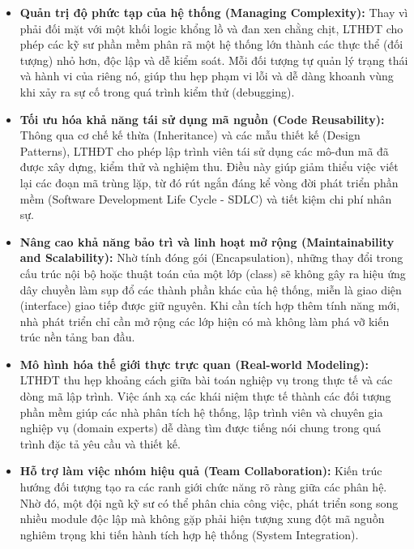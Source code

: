 \documentclass[12pt,a4paper]{article}
\begin{document}
\begin{itemize}[label={\scalebox{1.2}{$\circ$}}, leftmargin=2em]
    \item \textbf{Quản trị độ phức tạp của hệ thống (Managing Complexity):} Thay vì phải đối mặt với một khối logic khổng lồ và đan xen chằng chịt, LTHĐT cho phép các kỹ sư phần mềm phân rã một hệ thống lớn thành các thực thể (đối tượng) nhỏ hơn, độc lập và dễ kiểm soát. Mỗi đối tượng tự quản lý trạng thái và hành vi của riêng nó, giúp thu hẹp phạm vi lỗi và dễ dàng khoanh vùng khi xảy ra sự cố trong quá trình kiểm thử (debugging).
    
    \item \textbf{Tối ưu hóa khả năng tái sử dụng mã nguồn (Code Reusability):} Thông qua cơ chế kế thừa (Inheritance) và các mẫu thiết kế (Design Patterns), LTHĐT cho phép lập trình viên tái sử dụng các mô-đun mã đã được xây dựng, kiểm thử và nghiệm thu. Điều này giúp giảm thiểu việc viết lại các đoạn mã trùng lặp, từ đó rút ngắn đáng kể vòng đời phát triển phần mềm (Software Development Life Cycle - SDLC) và tiết kiệm chi phí nhân sự.
    
    \item \textbf{Nâng cao khả năng bảo trì và linh hoạt mở rộng (Maintainability and Scalability):} Nhờ tính đóng gói (Encapsulation), những thay đổi trong cấu trúc nội bộ hoặc thuật toán của một lớp (class) sẽ không gây ra hiệu ứng dây chuyền làm sụp đổ các thành phần khác của hệ thống, miễn là giao diện (interface) giao tiếp được giữ nguyên. Khi cần tích hợp thêm tính năng mới, nhà phát triển chỉ cần mở rộng các lớp hiện có mà không làm phá vỡ kiến trúc nền tảng ban đầu.
    
    \item \textbf{Mô hình hóa thế giới thực trực quan (Real-world Modeling):} LTHĐT thu hẹp khoảng cách giữa bài toán nghiệp vụ trong thực tế và các dòng mã lập trình. Việc ánh xạ các khái niệm thực tế thành các đối tượng phần mềm giúp các nhà phân tích hệ thống, lập trình viên và chuyên gia nghiệp vụ (domain experts) dễ dàng tìm được tiếng nói chung trong quá trình đặc tả yêu cầu và thiết kế.
    
    \item \textbf{Hỗ trợ làm việc nhóm hiệu quả (Team Collaboration):} Kiến trúc hướng đối tượng tạo ra các ranh giới chức năng rõ ràng giữa các phân hệ. Nhờ đó, một đội ngũ kỹ sư có thể phân chia công việc, phát triển song song nhiều module độc lập mà không gặp phải hiện tượng xung đột mã nguồn nghiêm trọng khi tiến hành tích hợp hệ thống (System Integration).
\end{itemize}
\end{document}
